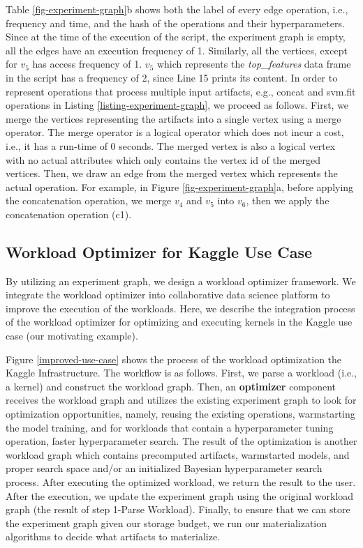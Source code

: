 Table \ref{fig-experiment-graph}b shows both the label of every edge operation, i.e., frequency and time, and the hash of the operations and their hyperparameters.
Since at the time of the execution of the script, the experiment graph is empty, all the edges have an execution frequency of 1.
Similarly, all the vertices, except for $v_5$ has access frequency of 1.
$v_5$ which represents the \textit{top\_features} data frame in the script has a frequency of 2, since Line 15 prints its content.
In order to represent operations that process multiple input artifacts, e.g., concat and svm.fit operations in Listing \ref{listing-experiment-graph}, we proceed as follows.
First, we merge the vertices representing the artifacts into a single vertex using a merge operator.
The merge operator is a logical operator which does not incur a cost, i.e., it has a run-time of 0 seconds.
The merged vertex is also a logical vertex with no actual attributes which only contains the vertex id of the merged vertices.
Then, we draw an edge from the merged vertex which represents the actual operation.
For example, in Figure \ref{fig-experiment-graph}a, before applying the concatenation operation, we merge $v_4$ and $v_5$ into $v_6$, then we apply the concatenation operation (c1).

\subsection{Workload Optimizer for Kaggle Use Case}
By utilizing an experiment graph, we design a workload optimizer framework.
We integrate the workload optimizer into collaborative data science platform to improve the execution of the workloads.
Here, we describe the integration process of the workload optimizer for optimizing and executing kernels in the Kaggle use case (our motivating example).

Figure \ref{improved-use-case} shows the process of the workload optimization the Kaggle Infrastructure. 
The workflow is as follows.
First, we parse a workload (i.e., a kernel) and construct the workload graph.
Then, an \textbf{optimizer} component receives the workload graph and utilizes the existing experiment graph to look for optimization opportunities, namely, reusing the existing operations, warmstarting the model training, and for workloads that contain a hyperparameter tuning operation, faster hyperparameter search.
The result of the optimization is another workload graph which contains precomputed artifacts, warmstarted models, and proper search space and/or an initialized Bayesian hyperparameter search process.
After executing the optimized workload, we return the result to the user.
After the execution, we update the experiment graph using the original workload graph (the result of step 1-Parse Workload).
Finally, to ensure that we can store the experiment graph given our storage budget, we run our materialization algorithms to decide what artifacts to materialize.

